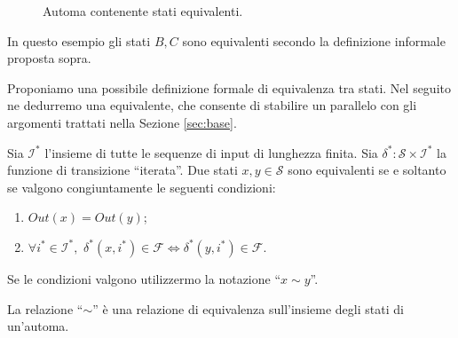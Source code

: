 \begin{example}
    \begin{figure}[b]
        \centering
        \caption{Automa contenente stati equivalenti.}
        \label{fig:automata_eq}
    \end{figure}
    In questo esempio gli stati $B,C$ sono equivalenti secondo la definizione informale proposta sopra.
\end{example}

Proponiamo una possibile definizione formale di equivalenza tra stati. Nel seguito ne dedurremo una equivalente, che consente di stabilire un parallelo con gli argomenti trattati nella Sezione \ref{sec:base}.
\begin{definition}
    \label{def:equivalent_states}
    Sia $\mathcal{I}^*$ l'insieme di tutte le sequenze di input di lunghezza finita. Sia $\delta^* : \mathcal{S} \times \mathcal{I}^*$ la funzione di transizione ``iterata''. Due stati $x,y \in \mathcal{S}$ sono equivalenti se e soltanto se valgono congiuntamente le seguenti condizioni:
    \begin{enumerate}
        \item $Out(x) = Out(y)$;
        \item $\forall i^* \in \mathcal{I}^*,\,\, \delta^*(x,i^*) \in \mathcal{F} \iff \delta^*(y,i^*) \in \mathcal{F}$.
    \end{enumerate}
    Se le condizioni valgono utilizzermo la notazione ``$x \sim y$''.
\end{definition}

\begin{observation}
    La relazione ``$\sim$'' è una relazione di equivalenza sull'insieme degli stati di un'automa.
\end{observation}

